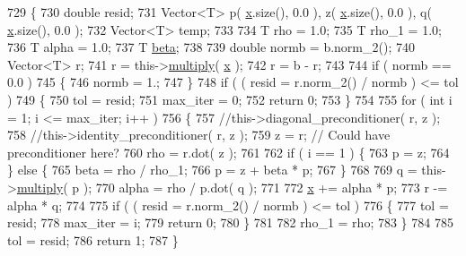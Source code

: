 \begin{DoxyCode}
729   \{
730     \textcolor{keywordtype}{double} resid;
731     Vector<T> p( \hyperlink{namespaceHeat__plot_aa88370c16b85b784ccbde3ed88bc1991}{x}.size(), 0.0 ), z( \hyperlink{namespaceHeat__plot_aa88370c16b85b784ccbde3ed88bc1991}{x}.size(), 0.0 ), q( \hyperlink{namespaceHeat__plot_aa88370c16b85b784ccbde3ed88bc1991}{x}.size(), 0.0 );
732     Vector<T> temp;
733 
734     T rho = 1.0;
735     T rho\_1 = 1.0;
736     T alpha = 1.0;
737     T \hyperlink{namespaceLuna_af542f1c7522ca96017105e160b54df80}{beta};
738 
739     \textcolor{keywordtype}{double} normb = b.norm\_2();
740     Vector<T> r;
741     r = this->\hyperlink{classLuna_1_1SparseMatrix_a532c8a8b80b0accf950a642344e7954f}{multiply}( \hyperlink{namespaceHeat__plot_aa88370c16b85b784ccbde3ed88bc1991}{x} );
742     r = b - r;
743 
744     \textcolor{keywordflow}{if} ( normb == 0.0 )
745     \{
746       normb = 1.;
747     \}
748     \textcolor{keywordflow}{if} ( ( resid = r.norm\_2() / normb ) <= tol )
749     \{
750       tol = resid;
751       max\_iter = 0;
752       \textcolor{keywordflow}{return} 0;
753     \}
754 
755     \textcolor{keywordflow}{for} ( \textcolor{keywordtype}{int} i = 1; i <= max\_iter; i++ )
756     \{
757       \textcolor{comment}{//this->diagonal\_preconditioner( r, z );}
758       \textcolor{comment}{//this->identity\_preconditioner( r, z );}
759       z = r; \textcolor{comment}{// Could have preconditioner here?}
760       rho = r.dot( z );
761 
762       \textcolor{keywordflow}{if} ( i == 1 ) \{
763         p = z;
764       \} \textcolor{keywordflow}{else} \{
765         beta = rho / rho\_1;
766         p = z + beta * p;
767       \}
768 
769       q = this->\hyperlink{classLuna_1_1SparseMatrix_a532c8a8b80b0accf950a642344e7954f}{multiply}( p );
770       alpha = rho / p.dot( q );
771 
772       \hyperlink{namespaceHeat__plot_aa88370c16b85b784ccbde3ed88bc1991}{x} += alpha * p;
773       r -= alpha * q;
774 
775       \textcolor{keywordflow}{if} ( ( resid = r.norm\_2() / normb ) <= tol )
776       \{
777         tol = resid;
778         max\_iter = i;
779         \textcolor{keywordflow}{return} 0;
780       \}
781 
782       rho\_1 = rho;
783     \}
784 
785     tol = resid;
786     \textcolor{keywordflow}{return} 1;
787   \}
\end{DoxyCode}
\mbox{\label{classLuna_1_1SparseMatrix_a45bef00e3aaeae37b3faf7de22e5e6f0}} 
